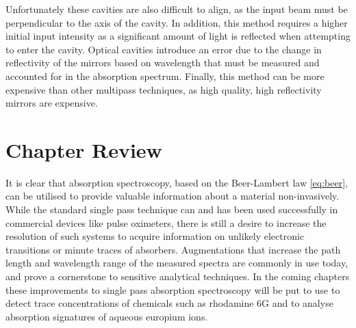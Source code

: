 
Unfortunately these cavities are also difficult to align, as the input beam
must be perpendicular to the axis of the cavity. In addition, this method
requires a higher initial input intensity as a significant amount of light is
reflected when attempting to enter the cavity. Optical cavities introduce an
error due to the change in reflectivity of the mirrors based on wavelength that
must be measured and accounted for in the absorption spectrum. Finally, this
method can be more expensive than other multipass techniques, as high quality,
high reflectivity mirrors are expensive.



\section*{Chapter Review}

It is clear that absorption spectroscopy, based on the Beer-Lambert law
\eqref{eq:beer}, can be utilised to provide valuable information about a
material non-invasively. While the standard single pass technique can and has
been used successfully in commercial devices like pulse oximeters, there is
still a desire to increase the resolution of such systems to acquire
information on unlikely electronic transitions or minute traces of absorbers.
Augmentations that increase the path length and wavelength range of the
measured spectra are commonly in use today, and prove a cornerstone to
sensitive analytical techniques. In the coming chapters these improvements to
single pass absorption spectroscopy will be put to use to detect trace
concentrations of chemicals such as rhodamine 6G and to analyse absorption
signatures of aqueous europium ions.
